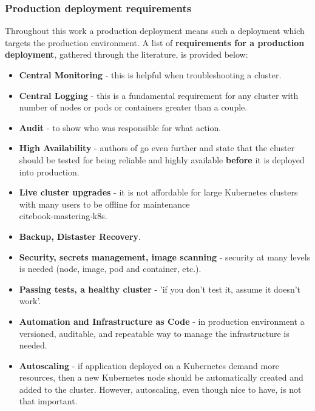 \subsubsection{Production deployment requirements}
\label{Production deployment requirements}
Throughout this work a production deployment means such a deployment which targets the production environment. A list of \textbf{requirements for a production deployment}, gathered through the literature, is provided below:
\begin{itemize}
\item \textbf{Central Monitoring} - this is helpful when troubleshooting a cluster\cite{book-mastering-k8s}\cite{online-weave-checklists}\cite{online-weave-guide}\cite{book-cndwk}.
\item \textbf{Central Logging} - this is a fundamental requirement for any cluster with number of nodes or pods or containers greater than a couple\cite{book-mastering-k8s}\cite{online-weave-checklists}\cite{book-devops-k8s}.
\item \textbf{Audit} - to show who was responsible for what action\cite{online-weave-guide}.
\item \textbf{High Availability} - authors of \cite{book-mastering-k8s} go even further and state that the cluster should be tested for being reliable and highly available \textbf{before} it is deployed into production\cite{book-mastering-k8s}\cite{book-cndwk}.
\item \textbf{Live cluster upgrades} - it is not affordable for large Kubernetes clusters with many users to be offline for maintenance\\cite{book-mastering-k8s}.
\item \textbf{Backup, Distaster Recovery}\cite{book-mastering-k8s}\cite{online-weave-guide}\cite{book-cndwk}.
\item \textbf{Security, secrets management, image scanning} - security at many levels is needed (node, image, pod and container, etc.)\cite{book-mastering-k8s}\cite{online-weave-checklists}\cite{online-weave-guide}\cite{book-cndwk}.
\item \textbf{Passing tests, a healthy cluster} - 'if you don't test it, assume it doesn't work'\cite{book-mastering-k8s}\cite{book-cndwk}.
\item \textbf{Automation and Infrastructure as Code} - in production environment a versioned, auditable, and repeatable way to manage the infrastructure is needed\cite{book-mastering-k8s}\cite{online-weave-guide}.
\item \textbf{Autoscaling} - if application deployed on a Kubernetes demand more resources, then a new Kubernetes node should be automatically created and added to the cluster. However, autoscaling, even though nice to have, is not that important\cite{book-cndwk}.
\end{itemize}

